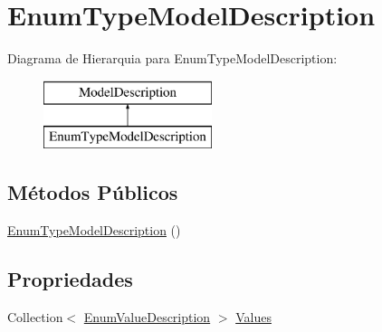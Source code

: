 \hypertarget{classApi3Layers_1_1Areas_1_1HelpPage_1_1ModelDescriptions_1_1EnumTypeModelDescription}{}\section{Enum\+Type\+Model\+Description}
\label{classApi3Layers_1_1Areas_1_1HelpPage_1_1ModelDescriptions_1_1EnumTypeModelDescription}
Diagrama de Hierarquia para Enum\+Type\+Model\+Description\+:\begin{figure}[H]
\begin{center}
\leavevmode
\includegraphics[height=2.000000cm]{d3/d68/classApi3Layers_1_1Areas_1_1HelpPage_1_1ModelDescriptions_1_1EnumTypeModelDescription}
\end{center}
\end{figure}
\subsection*{Métodos Públicos}
\begin{DoxyCompactItemize}
\item 
\hyperlink{classApi3Layers_1_1Areas_1_1HelpPage_1_1ModelDescriptions_1_1EnumTypeModelDescription_aab56d4e1f9f95ea7cc99ae3b97f3d4ba}{Enum\+Type\+Model\+Description} ()
\end{DoxyCompactItemize}
\subsection*{Propriedades}
\begin{DoxyCompactItemize}
\item 
Collection$<$ \hyperlink{classApi3Layers_1_1Areas_1_1HelpPage_1_1ModelDescriptions_1_1EnumValueDescription}{Enum\+Value\+Description} $>$ \hyperlink{classApi3Layers_1_1Areas_1_1HelpPage_1_1ModelDescriptions_1_1EnumTypeModelDescription_a4ca976ae041bc461662fd30b56fee02e}{Values}
\end{DoxyCompactItemize}


